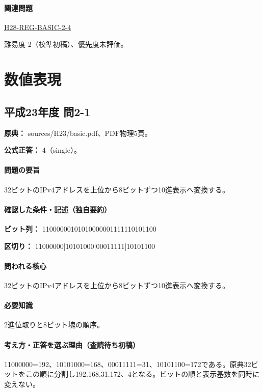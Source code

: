 \paragraph{関連問題} \hyperref[q:h28-reg-basic-2-4]{H28-REG-BASIC-2-4}

\par 難易度 2（校準初稿）、優先度未評価。

\section{数値表現}

\subsection{平成23年度 問2-1}
\label{q:h23-reg-basic-2-1}

\noindent\textbf{原典：} sources/H23/basic.pdf、PDF物理5頁。

\textbf{公式正答：} 4（single）。

\paragraph{問題の要旨} 32ビットのIPv4アドレスを上位から8ビットずつ10進表示へ変換する。

\paragraph{確認した条件・記述（独自要約）}\mbox{}\par

\noindent\textbf{ビット列：} 11000000101010000001111110101100\par

\noindent\textbf{区切り：} 11000000|10101000|00011111|10101100\par

\paragraph{問われる核心} 32ビットのIPv4アドレスを上位から8ビットずつ10進表示へ変換する。

\paragraph{必要知識} 2進位取りと8ビット塊の順序。

\paragraph{考え方・正答を選ぶ理由（査読待ち初稿）} 11000000=\allowbreak{}192、10101000=\allowbreak{}168、00011111=\allowbreak{}31、10101100=\allowbreak{}172である。原典32ビットをこの順に分割し192.168.31.172、4となる。ビットの順と表示基数を同時に変えない。

